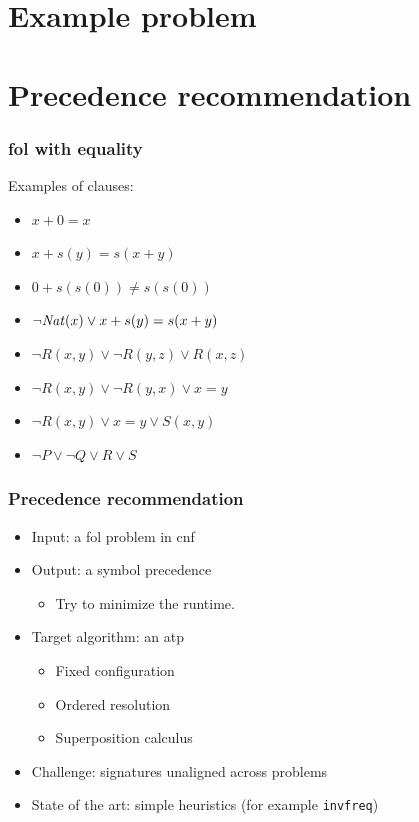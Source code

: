 \documentclass[a4paper]{beamer}
\author[F. Bártek]{Filip Bártek}
\title{\DissertationTitle}
\institute[\FacultyAndUniversityAbbr]{\University}
\date{\DTMdate{2022-03-23}}
\begin{document}
\begin{frame}
\titlepage
\end{frame}

\section{Example problem}



\section{Precedence recommendation}

\begin{frame}
\frametitle{\Gls{fol} with equality}
Examples of clauses:
\begin{itemize}
\item $x + 0 = x$
\item $x + s(y) = s(x + y)$
\item $0 + s(s(0)) \neq s(s(0))$
\item $\lnot \mathit{Nat}(x) \lor x + s(y) = s(x + y)$
\item $\lnot R(x, y) \lor \lnot R(y, z) \lor R(x, z)$
\item $\lnot R(x, y) \lor \lnot R(y, x) \lor x = y$
\item $\lnot R(x, y) \lor x = y \lor S(x, y)$
\item $\lnot P \lor \lnot Q \lor R \lor S$
\end{itemize}
\end{frame}

\begin{frame}
\frametitle{Precedence recommendation}
\begin{itemize}
\item Input: a \gls{fol} problem in \gls{cnf}
\item Output: a symbol precedence
\begin{itemize}
\item Try to minimize the runtime.
\end{itemize}
\item Target algorithm: an \gls{atp}
\begin{itemize}
\item Fixed configuration
\item Ordered resolution
\item Superposition calculus
\end{itemize}
\item Challenge: signatures unaligned across problems
\item State of the art: simple heuristics (for example \texttt{invfreq})
\end{itemize}
\end{frame}
\end{document}
